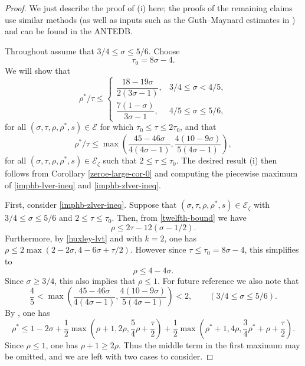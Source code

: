 \documentclass[a4paper, 10pt]{amsart}
\newcommand{\Energy}{\mathcal{E}}
\begin{document}
\begin{proof}  We just describe the proof of (i) here; the proofs of the remaining claims use similar methods (as well as inputs such as the Guth--Maynard estimates in \cite{guth-maynard}) and can be found in the ANTEDB.

Throughout assume that $3/4 \le \sigma \le 5/6$. Choose
\[
\tau_0 = 8\sigma - 4.
\]
We will show that
\begin{equation}\label{imphb-lver-ineq}
\rho^*/\tau \le \begin{cases}
\dfrac{18 - 19\sigma}{2(3\sigma - 1)},&3/4 \le \sigma < 4/5,\\
\dfrac{7(1 - \sigma)}{3\sigma - 1},&4/5 \le \sigma \le 5/6,
\end{cases}
\end{equation}
for all $(\sigma, \tau, \rho, \rho^*, s) \in \Energy$ for which $\tau_0 \le \tau \le 2\tau_0$, and that
\begin{equation}\label{imphb-zlver-ineq}
\rho^*/\tau \le \max\left(\frac{45 - 46\sigma}{4(4\sigma - 1)}, \frac{4(10 - 9\sigma)}{5(4\sigma - 1)}\right),
\end{equation}
for all $(\sigma, \tau, \rho, \rho^*, s) \in \Energy_\zeta$ such that $2 \le \tau \le \tau_0$. The desired result (i) then follows from Corollary \ref{zeroe-large-cor-0} and computing the piecewise maximum of \eqref{imphb-lver-ineq} and \eqref{imphb-zlver-ineq}.

First, consider \eqref{imphb-zlver-ineq}. Suppose that $(\sigma, \tau, \rho, \rho^*, s)\in \Energy_\zeta$ with $3/4 \le \sigma \le 5/6$ and $2 \le \tau \le \tau_0$. Then, from \eqref{twelfth-bound} we have
\begin{equation}\label{hb-lv-rho-form}
\rho \le 2\tau - 12(\sigma - 1/2).
\end{equation}
Furthermore, by \eqref{huxley-lvt} and  with $k = 2$, one has $\rho \le 2\max(2 - 2\sigma, 4 - 6\sigma + \tau/2)$. However since $\tau \le \tau_0 = 8\sigma - 4$, this simplifies to
\begin{equation}
\label{huxley-lv-rho-form2}
\rho \le 4 - 4\sigma.
\end{equation}
Since $\sigma \ge 3/4$, this also implies that $\rho \le 1$. For future reference we also note that
\begin{equation}\label{zlver:tau-gradient-1}
\frac{4}{5} < \max\left(\frac{45 - 46\sigma}{4(4\sigma - 1)}, \frac{4(10 - 9\sigma)}{5(4\sigma - 1)}\right) < 2,\qquad (3/4 \le \sigma \le 5/6).
\end{equation}
By , one has
\[
\rho^* \leq 1-2\sigma + \frac{1}{2}\max\left(\rho+1, 2\rho, \frac{5}{4}\rho+\frac{\tau}{2}\right) + \frac{1}{2}\max\left(\rho^*+1, 4\rho, \frac{3}{4}\rho^*+\rho+\frac{\tau}{2}\right).
\]
Since $\rho \le 1$, one has $\rho + 1 \ge 2\rho$. Thus the middle term in the first maximum may be omitted, and we are left with two cases to consider.


\end{proof}
\end{document}
